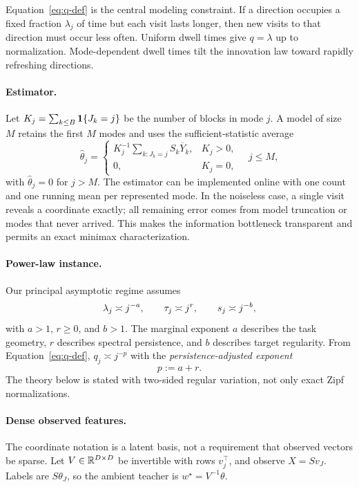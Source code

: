 Equation~\eqref{eq:q-def} is the central modeling constraint.  If a direction
occupies a fixed fraction $\lambda_j$ of time but each visit lasts longer, then
new visits to that direction must occur less often.  Uniform dwell times give
$q=\lambda$ up to normalization.  Mode-dependent dwell times tilt the
innovation law toward rapidly refreshing directions.

\paragraph{Estimator.}
Let
$K_j=\sum_{k\le B}\mathbf{1}\{J_k=j\}$ be the number of blocks in mode $j$.  A model of
size $M$ retains the first $M$ modes and uses the sufficient-statistic average
\begin{equation}
\widehat\theta_j=
\begin{cases}
K_j^{-1}\sum_{k:J_k=j}S_k\overline Y_k,&K_j>0,\\
0,&K_j=0,
\end{cases}
\quad j\le M,
\label{eq:estimator}
\end{equation}
with $\widehat\theta_j=0$ for $j>M$.  The estimator can be implemented online
with one count and one running mean per represented mode.  In the noiseless
case, a single visit reveals a coordinate exactly; all remaining error comes
from model truncation or modes that never arrived.  This makes the information
bottleneck transparent and permits an exact minimax characterization.

\paragraph{Power-law instance.}
Our principal asymptotic regime assumes
\begin{equation}
\lambda_j\mathrel{\asymp} j^{-a},
\qquad
\tau_j\mathrel{\asymp} j^r,
\qquad
s_j\mathrel{\asymp} j^{-b},
\label{eq:power-laws}
\end{equation}
with $a>1$, $r\ge0$, and $b>1$.  The marginal exponent $a$ describes the task
geometry, $r$ describes spectral persistence, and $b$ describes target
regularity.  From Equation~\eqref{eq:q-def},
$q_j\asymp j^{-p}$ with the \emph{persistence-adjusted exponent}
\begin{equation}
p:=a+r.
\label{eq:p-definition}
\end{equation}
The theory below is stated with two-sided regular variation, not only exact
Zipf normalizations.

\paragraph{Dense observed features.}
The coordinate notation is a latent basis, not a requirement that observed
vectors be sparse.  Let $V\in\mathbb{R}^{D\times D}$ be invertible with rows
$v_j^\top$, and observe $X=Sv_J$.  Labels are $S\theta_J$, so the ambient
teacher is $w^\star=V^{-1}\theta$.

